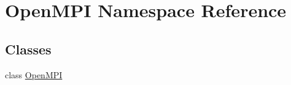 \hypertarget{namespaceOpenMPI}{\section{Open\-M\-P\-I Namespace Reference}
\label{namespaceOpenMPI}
}
\subsection*{Classes}
\begin{DoxyCompactItemize}
\item 
class \hyperlink{classOpenMPI_1_1OpenMPI}{Open\-M\-P\-I}
\end{DoxyCompactItemize}

